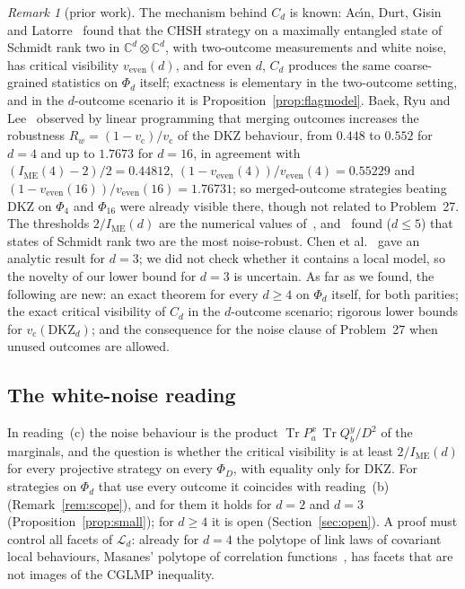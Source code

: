 \documentclass[11pt]{article}
\theoremstyle{remark}
\newtheorem{remark}[lemma]{Remark}
\numberwithin{equation}{section}
\newcommand{\C}{\mathbb{C}}
\newcommand{\Tr}{\operatorname{Tr}}
\newcommand{\IME}{I_{\mathrm{ME}}}
\newcommand{\cL}{\mathcal{L}}
\newcommand{\vc}{v_{\mathrm c}}
\newcommand{\veven}{v_{\mathrm{even}}}
\newcommand{\DKZ}{\mathrm{DKZ}}
\begin{document}
\begin{remark}[prior work]\label{rem:literalcredit}
The mechanism behind $C_d$ is known: Ac\'{\i}n, Durt, Gisin and Latorre~\cite[eq.~(14)]{ADGL} found that the CHSH
strategy on a maximally entangled state of Schmidt rank two in $\C^d\otimes\C^d$, with two-outcome measurements and white
noise, has critical visibility $\veven(d)$, and for even $d$, $C_d$ produces the same coarse-grained statistics on
$\Phi_d$ itself; exactness is elementary in the two-outcome setting, and in the $d$-outcome scenario it is
Proposition~\ref{prop:flagmodel}. Baek, Ryu and Lee~\cite{BRL} observed by linear programming that merging outcomes
increases the robustness $R_w=(1-\vc)/\vc$ of the DKZ behaviour, from $0.448$ to $0.552$ for $d=4$ and up to $1.7673$
for $d=16$, in agreement with $(\IME(4)-2)/2=0.44812$, $(1-\veven(4))/\veven(4)=0.55229$ and
$(1-\veven(16))/\veven(16)=1.76731$; so merged-outcome strategies beating DKZ on
$\Phi_4$ and $\Phi_{16}$ were already visible there, though not related to Problem~27. The thresholds $2/\IME(d)$ are the
numerical values of~\cite{KGZMZ,DKZ,CGLMP,GLZ}, and~\cite{GLZ} found ($d\le5$) that states of Schmidt rank two are the
most noise-robust. Chen et al.~\cite{Chen01} gave an analytic result for $d=3$; we did not check whether it contains a local model, so the novelty of our lower bound for
$d=3$ is uncertain. As far as we found, the following are new: an exact theorem for every $d\ge4$ on $\Phi_d$ itself,
for both parities; the exact critical visibility of $C_d$ in the $d$-outcome scenario; rigorous lower bounds for
$\vc(\DKZ_d)$; and the consequence for the noise clause of Problem~27 when unused outcomes are allowed.
\end{remark}

\subsection{The white-noise reading}\label{subsec:white}
In reading~(c) the noise behaviour is the product $\Tr P^x_a\,\Tr Q^y_b/D^2$ of the marginals, and the question is
whether the critical visibility is at least $2/\IME(d)$ for every projective strategy on every $\Phi_D$, with equality
only for DKZ. For strategies on $\Phi_d$ that use every outcome it coincides with reading~(b) (Remark~\ref{rem:scope}), and
for them it holds for $d=2$ and $d=3$ (Proposition~\ref{prop:small}); for $d\ge4$ it is open (Section~\ref{sec:open}). A proof must control
all facets of $\cL_d$: already for $d=4$ the polytope of link laws of covariant local behaviours, Masanes' polytope of
correlation functions~\cite{Masanes}, has facets that are not images of the CGLMP inequality.
\end{document}
